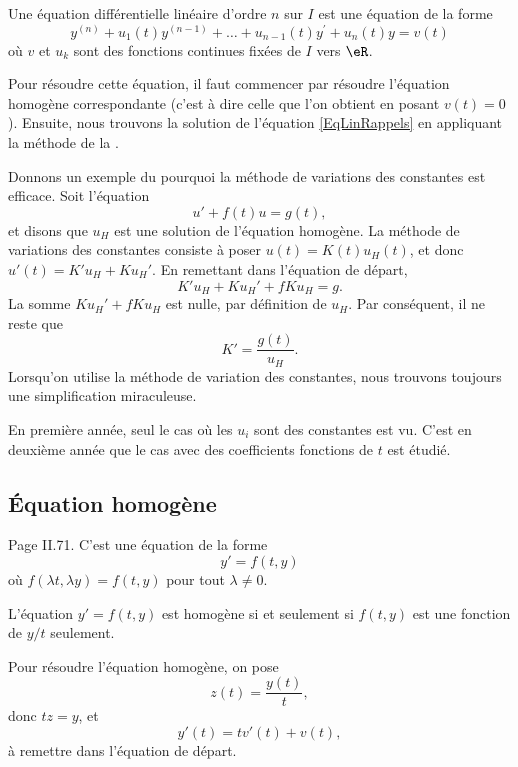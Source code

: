 Une équation différentielle linéaire d'ordre $n$ sur $I$ est une
équation de la forme
\begin{equation}	\label{EqLinRappels}
	y^{(n)} + u_1(t) y^{(n-1)} + \ldots + u_{n-1}(t) y^\prime + u_n(t) y = v(t)
\end{equation}
où $v$ et $u_k$ sont des fonctions continues fixées de $I$ vers $\eR$.

Pour résoudre cette équation, il faut commencer par résoudre l'équation homogène correspondante (c'est à dire celle que l'on obtient en posant $v(t)=0$). Ensuite, nous trouvons la solution de l'équation \eqref{EqLinRappels} en appliquant la méthode de la .

Donnons un exemple du pourquoi la méthode de variations des constantes est efficace. Soit l'équation 
\begin{equation}		\label{EqDiffExempleVarCst}
	u'+f(t)u=g(t),
\end{equation}
 et disons que $u_H$ est une solution de l'équation homogène. La méthode de variations des constantes consiste à poser $u(t)=K(t)u_H(t)$, et donc $u'(t)=K'u_H+Ku_H'$. En remettant dans l'équation de départ,
\begin{equation}
	K'u_H+Ku_H'+fKu_H=g.
\end{equation}
La somme $Ku_H'+fKu_H$ est nulle, par définition de $u_H$. Par conséquent, il ne reste que
\begin{equation}
	K'=\frac{ g(t) }{ u_H }.
\end{equation}
Lorsqu'on utilise la méthode de variation des constantes, nous trouvons toujours une simplification \og miraculeuse\fg.

En première année, seul le cas où les $u_i$ sont des constantes est vu. C'est en deuxième année que le cas avec des coefficients fonctions de $t$ est étudié.


					\subsection{Équation homogène}
\label{SubSecEqDiffHomo}

Page II.71. C'est une équation de la forme
\begin{equation}
	y'=f(t,y)
\end{equation}
où $f(\lambda t,\lambda y)=f(t,y)$ pour tout $\lambda\neq 0$.
\begin{lemma}
L'équation $y'=f(t,y)$ est homogène si et seulement si $f(t,y)$ est une fonction de $y/t$ seulement.
\end{lemma}
Pour résoudre l'équation homogène, on pose
\begin{equation}		\label{EqDiffHomoPoser}
	z(t)=\frac{ y(t) }{ t },
\end{equation}
donc $tz=y$, et 
\begin{equation}
	y'(t)=tv'(t)+v(t),
\end{equation}
à remettre dans l'équation de départ.

